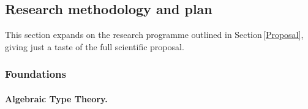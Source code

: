 \documentclass[11pt,twocolumn]{article}
\newcommand{\hide}[1]{}
\begin{document}
\subsection{Research methodology and plan}

This section expands on the research programme outlined in
Section\,\ref{Proposal}, giving just a taste of the full scientific proposal.

\subsubsection{Foundations}
\label{Foundations}

\setcounter{paragraph}{0}
\paragraph{Algebraic Type Theory.}
\label{AlgebraicTypeTheoryParagraph}

\hide{
To understand our approach it is best to start by stripping type theories
down to their essential bare structure.  To do so, let us eliminate type
constructors and binding operators from them.  What one is left with is a
notion of type theory that reduces to that of many-sorted algebraic
theory~\cite{Birkhoff}, a thoroughly studied area of abstract algebra.
}
\end{document}
